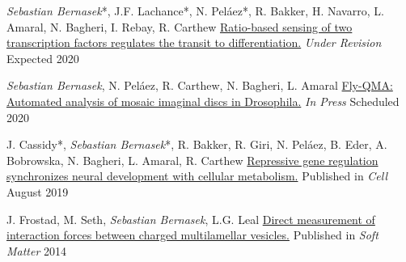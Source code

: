 

\begin{cventries}


  \cventrypub
    {\emph{Sebastian Bernasek}*, J.F. Lachance*, N. Pel\'{a}ez*, R. Bakker, H. Navarro, L. Amaral, N. Bagheri, I. Rebay, R. Carthew}
    {\href{https://doi.org/10.1101/430744}{Ratio-based sensing of two transcription factors regulates the transit to differentiation.}}
    {\emph{Under Revision}}
    {Expected 2020}   
  
  \cventrypub
    {\emph{Sebastian Bernasek}, N. Pel\'{a}ez, R. Carthew, N. Bagheri, L. Amaral}
    {\href{https://doi.org/10.1101/775783}{Fly-QMA: Automated analysis of mosaic imaginal discs in Drosophila.}}
    {\emph{In Press}}
    {Scheduled 2020}  
  
  \cventrypub
    {J. Cassidy*, \emph{Sebastian Bernasek}*, R. Bakker, R. Giri, N. Pel\'{a}ez, B. Eder, A. Bobrowska, N. Bagheri, L. Amaral, R. Carthew}
    {\href{https://doi.org/10.1016/j.cell.2019.06.023}{Repressive gene regulation synchronizes neural development with cellular metabolism.}}
    {Published in \emph{Cell}}
    {August 2019}
  
  \cventrypub
    {J. Frostad, M. Seth, \emph{Sebastian Bernasek}, L.G. Leal}
    {\href{https://www.ncbi.nlm.nih.gov/pubmed/25141827}{Direct measurement of interaction forces between charged multilamellar vesicles.}}
    {Published in \emph{Soft Matter}}
    {2014} 
    

\end{cventries}
